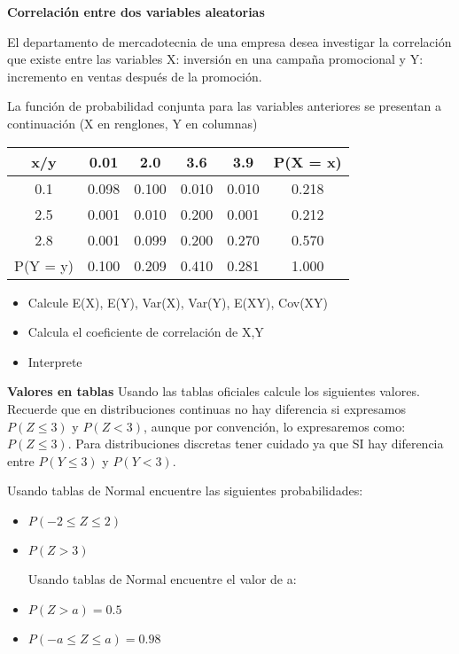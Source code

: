 \documentclass{oxmathproblems}
\begin{document}
\begin{questions}

\miquestion \textbf{Correlación entre dos variables aleatorias} 

El departamento de mercadotecnia de una empresa desea investigar la correlación que existe entre las variables X: inversión en una campaña promocional y Y: incremento en ventas después de la promoción.

La función de probabilidad conjunta para las variables anteriores se presentan a continuación (X en renglones, Y en columnas)

\begin{center}
\begin{tabular}{ |c|c|c|c|c|c| } 
 \hline
 \textbf{x/y} & \textbf{0.01} & \textbf{2.0} & \textbf{3.6} & \textbf{3.9} & \textbf{P(X = x)} \\
 \hline
 0.1 & 0.098 & 0.100 & 0.010 & 0.010 & 0.218 \\
 2.5 & 0.001 & 0.010 & 0.200 & 0.001 & 0.212 \\
 2.8 & 0.001 & 0.099 & 0.200 & 0.270 & 0.570 \\ 
 \hline
 P(Y = y) & 0.100 & 0.209 & 0.410 & 0.281 & 1.000 \\
 \hline
\end{tabular}
\end{center}

\begin{itemize}
\item Calcule E(X), E(Y), Var(X), Var(Y), E(XY), Cov(XY)
\item Calcula el coeficiente de correlación de X,Y
\item Interprete
\end{itemize}

\miquestion \textbf{Valores en tablas} 
Usando las tablas oficiales calcule los siguientes valores. Recuerde que en distribuciones continuas no hay diferencia si expresamos $P(Z\leq 3)$ y $P(Z < 3)$, aunque por convención, lo expresaremos como: $P(Z\leq 3)$. Para distribuciones discretas tener cuidado ya que SI hay diferencia entre $P(Y\leq 3)$ y $P(Y < 3)$.


Usando tablas de Normal encuentre las siguientes probabilidades:
\begin{itemize}
\item $P(-2 \leq Z \leq 2)$
\item $P(Z > 3)$

Usando tablas de Normal encuentre el valor de a:
\item $P(Z > a) = 0.5$
\item $P(-a \leq Z \leq a) = 0.98$
\end{itemize}


\end{questions}
\end{document}
